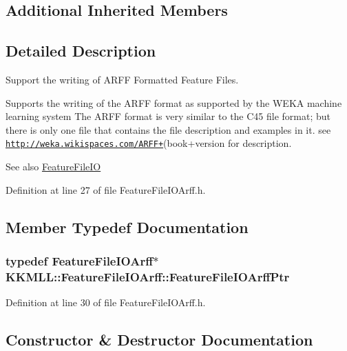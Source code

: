 \subsection*{Additional Inherited Members}


\subsection{Detailed Description}
Support the writing of A\+R\+FF Formatted Feature Files. 

Supports the writing of the A\+R\+FF format as supported by the W\+E\+KA machine learning system The A\+R\+FF format is very similar to the C45 file format; but there is only one file that contains the file description and examples in it. see \href{http://weka.wikispaces.com/ARFF+}{\tt http\+://weka.\+wikispaces.\+com/\+A\+R\+F\+F+}(book+version for description. \begin{DoxySeeAlso}{See also}
\hyperlink{class_k_k_m_l_l_1_1_feature_file_i_o}{Feature\+File\+IO} 
\end{DoxySeeAlso}


Definition at line 27 of file Feature\+File\+I\+O\+Arff.\+h.



\subsection{Member Typedef Documentation}
\subsubsection[{\texorpdfstring{Feature\+File\+I\+O\+Arff\+Ptr}{FeatureFileIOArffPtr}}]{\setlength{\rightskip}{0pt plus 5cm}typedef {\bf Feature\+File\+I\+O\+Arff}$\ast$ {\bf K\+K\+M\+L\+L\+::\+Feature\+File\+I\+O\+Arff\+::\+Feature\+File\+I\+O\+Arff\+Ptr}}\hypertarget{class_k_k_m_l_l_1_1_feature_file_i_o_arff_a131bf2bfec59d3ecc772cb03092db122}{}\label{class_k_k_m_l_l_1_1_feature_file_i_o_arff_a131bf2bfec59d3ecc772cb03092db122}


Definition at line 30 of file Feature\+File\+I\+O\+Arff.\+h.



\subsection{Constructor \& Destructor Documentation}
